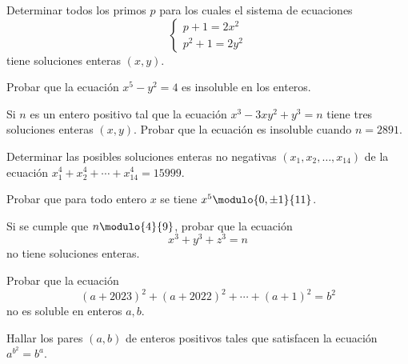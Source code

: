 \begin{problem}
    Determinar todos los primos $p$ para los cuales el sistema de ecuaciones
    \[
        \begin{cases}
            p + 1 = 2x^2\\
            p^2 + 1 = 2y^2
        \end{cases}
    \]
    tiene soluciones enteras $(x,y)$.
\end{problem}

\begin{problem}
    Probar que la ecuación $x^5 - y^2 = 4$ es insoluble en los enteros.
\end{problem}

\begin{problem}
    Si $n$ es un entero positivo tal que la ecuación $x^3 - 3xy^2 + y^3 = n$ tiene tres soluciones enteras $(x,y)$.
    Probar que la ecuación es insoluble cuando $n = 2891$.
\end{problem}

\begin{problem}
    Determinar las posibles soluciones enteras no negativas $(x_1, x_2, \ldots, x_{14})$ de la ecuación $x_1^4 + x_2^4 + \cdots + x_{14}^4 = 15999$.
\end{problem}

\begin{exercise}
    Probar que para todo entero $x$ se tiene $x^5 \modulo{0,\pm 1}{11}$.
\end{exercise}

\begin{problem}
    Si se cumple que $n \modulo{4}{9}$, probar que la ecuación
    \[
        x^3 + y^3 + z^3 = n
    \]
    no tiene soluciones enteras.
\end{problem}

\begin{problem}
    Probar que la ecuación
    \[
        (a + 2023)^2 + (a + 2022)^2 + \cdots + (a + 1)^2 = b^2
    \]
    no es soluble en enteros $a,b$.
\end{problem}

\begin{problem}
    Hallar los pares $(a,b)$ de enteros positivos tales que satisfacen la ecuación $a^{b^2} = b^a$.
\end{problem}